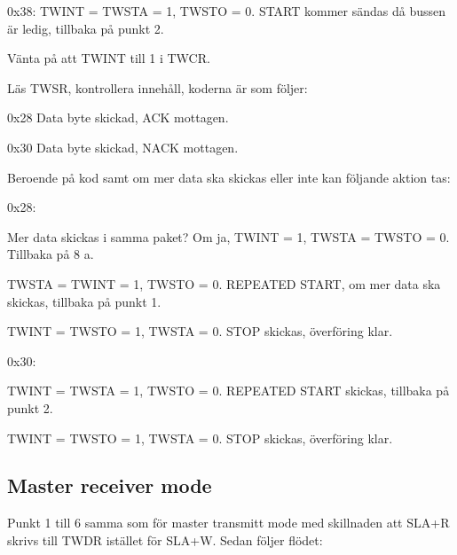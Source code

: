 \begin{packed_enumerate}
\begin{packed_enumerate}
\item 0x38: TWINT = TWSTA = 1, TWSTO = 0. START kommer sändas då bussen är ledig, tillbaka på punkt 2.
\end{packed_enumerate}
\item Vänta på att TWINT till 1 i TWCR.
\item Läs TWSR, kontrollera innehåll, koderna är som följer:
\begin{packed_enumerate}
\item 0x28 Data byte skickad, ACK mottagen.
\item 0x30 Data byte skickad, NACK mottagen.
\end{packed_enumerate}
\item Beroende på kod samt om mer data ska skickas eller inte kan följande aktion tas:
\begin{packed_enumerate}
\item 0x28:
\begin{packed_enumerate}
\item Mer data skickas i samma paket? Om ja, TWINT = 1, TWSTA = TWSTO = 0. Tillbaka på 8 a.
\item TWSTA = TWINT = 1, TWSTO = 0. REPEATED START, om mer data ska skickas, tillbaka på punkt 1.
\item TWINT = TWSTO = 1, TWSTA = 0. STOP skickas, överföring klar.
\end{packed_enumerate}
\item 0x30:
\begin{packed_enumerate}
\item TWINT = TWSTA = 1, TWSTO = 0. REPEATED START skickas, tillbaka på punkt 2.
\item TWINT = TWSTO = 1, TWSTA = 0. STOP skickas, överföring klar.
\end{packed_enumerate}
\end{packed_enumerate}
\end{packed_enumerate}

\subsection{Master receiver mode}
Punkt 1 till 6 samma som för master transmitt mode med skillnaden att SLA+R skrivs till TWDR istället för SLA+W. Sedan följer flödet:

